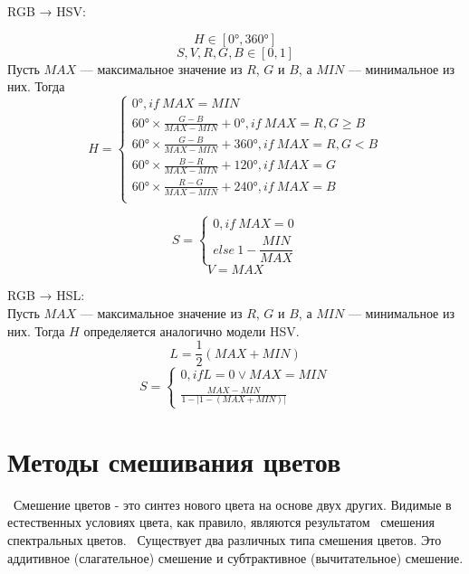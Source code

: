 RGB → HSV: 

\begin{equation}
 H \in [0°, 360°] 
 \end{equation}
 \begin{equation}
 S,V,R,G,B \in [0,1]
\end{equation}
Пусть $MAX$ — максимальное значение из $R$, $G$ и $B$, а $MIN$ — минимальное из них. Тогда
\begin{equation}
H={\begin{cases} 0°,        if ~ MAX=MIN \\
	60°\times {\frac  {G-B}{MAX-MIN}}+0°, if~MAX=R, G\geq B \\
	60°\times {\frac  {G-B}{MAX-MIN}}+360°, if~MAX=R, G < B \\
	60°\times {\frac  {B-R}{MAX-MIN}}+120°, if~MAX=G \\
	60°\times {\frac  {R-G}{MAX-MIN}}+240°, if~ MAX= B \\
	\end{cases}}
\end{equation}

 \begin{equation}
S={\begin{cases} 0, if~{\displaystyle MAX=0} \\
else~{\displaystyle 1-{\dfrac {MIN}{MAX}}}  
	\end{cases}}	
\end{equation}
 \begin{equation}
V=MAX
\end{equation}

RGB → HSL:\\
Пусть $MAX$ — максимальное значение из $R$, $G$ и $B$, а $MIN$ — минимальное из них. Тогда $H$ определяется аналогично модели HSV.
 \begin{equation}
L=\frac{1}{2}(MAX+MIN)
\end{equation}
 \begin{equation}
S={\begin{cases} 0, if  L = 0 \vee MAX = MIN \\
	 \frac{MAX-MIN}{1-|1-(MAX+MIN)|}
	\end{cases}}
\end{equation}

\section{Методы смешивания цветов}
 Смешение цветов - это синтез нового цвета на основе двух других.  Видимые в естественных условиях цвета, как правило, являются результатом
 смешения спектральных цветов.
 Существует два различных типа смешения цветов. Это аддитивное (слагательное) смешение и субтрактивное (вычитательное) смешение.
 
